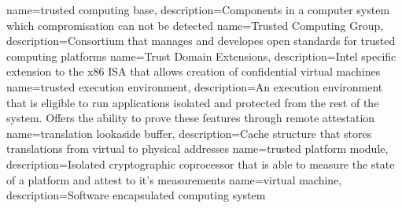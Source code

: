 %
{
  name=trusted computing base,
  description={Components in a computer system which compromisation can not be detected}
}
{
  name=Trusted Computing Group,
  description={Consortium that manages and developes open standards for trusted computing platforms}
}
{
  name=Trust Domain Extensions,
  description={Intel specific extension to the x86 ISA that allows creation of confidential virtual machines}
}
{
  name=trusted execution environment,
  description={An execution environment that is eligible to run applications isolated and protected from the rest of
  the system. Offers the ability to prove these features through remote attestation}
}
{
  name=translation lookaside buffer,
  description={Cache structure that stores translations from virtual to physical addresses}
}
{
  name=trusted platform module,
  description={Isolated cryptographic coprocessor that is able to measure the state of a platform and attest to it's measurements}
}
%
{
  name=virtual machine,
  description={Software encapsulated computing system}
}
